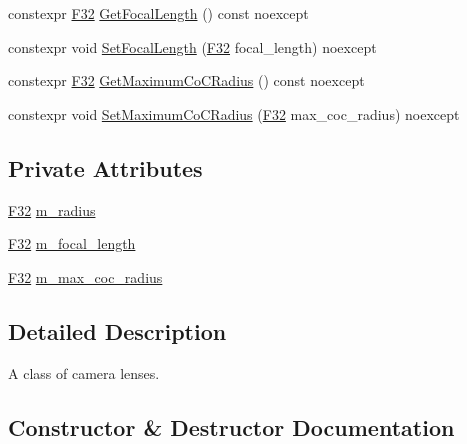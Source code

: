 \begin{DoxyCompactItemize}
\item 
constexpr \hyperlink{namespacemage_aa97e833b45f06d60a0a9c4fc22ae02c0}{F32} \hyperlink{classmage_1_1_camera_lens_ad28fb2b3ffad0070f0e152e189fd50b6}{Get\+Focal\+Length} () const noexcept
\item 
constexpr void \hyperlink{classmage_1_1_camera_lens_a9b6bf491697ac11bd236812148bb78ec}{Set\+Focal\+Length} (\hyperlink{namespacemage_aa97e833b45f06d60a0a9c4fc22ae02c0}{F32} focal\+\_\+length) noexcept
\item 
constexpr \hyperlink{namespacemage_aa97e833b45f06d60a0a9c4fc22ae02c0}{F32} \hyperlink{classmage_1_1_camera_lens_aba81adddf97b7630e36b3cfc1c04a2d4}{Get\+Maximum\+Co\+C\+Radius} () const noexcept
\item 
constexpr void \hyperlink{classmage_1_1_camera_lens_a9e1b123054574d0e4de775d9b7b97e48}{Set\+Maximum\+Co\+C\+Radius} (\hyperlink{namespacemage_aa97e833b45f06d60a0a9c4fc22ae02c0}{F32} max\+\_\+coc\+\_\+radius) noexcept
\end{DoxyCompactItemize}
\subsection*{Private Attributes}
\begin{DoxyCompactItemize}
\item 
\hyperlink{namespacemage_aa97e833b45f06d60a0a9c4fc22ae02c0}{F32} \hyperlink{classmage_1_1_camera_lens_ad32c883707e4571d307221a308bb1e36}{m\+\_\+radius}
\item 
\hyperlink{namespacemage_aa97e833b45f06d60a0a9c4fc22ae02c0}{F32} \hyperlink{classmage_1_1_camera_lens_aa0f9753195fd3c3de2006d4bd2d6fa81}{m\+\_\+focal\+\_\+length}
\item 
\hyperlink{namespacemage_aa97e833b45f06d60a0a9c4fc22ae02c0}{F32} \hyperlink{classmage_1_1_camera_lens_aec350fe54ff0b7a2c32466b4d59e225b}{m\+\_\+max\+\_\+coc\+\_\+radius}
\end{DoxyCompactItemize}


\subsection{Detailed Description}
A class of camera lenses. 

\subsection{Constructor \& Destructor Documentation}
\hypertarget{classmage_1_1_camera_lens_a88d52a301da313a209c7772ac83c0723}{}\label{classmage_1_1_camera_lens_a88d52a301da313a209c7772ac83c0723} 
